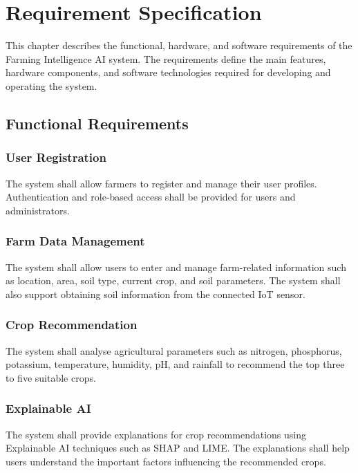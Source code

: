 \chapter{Requirement Specification}

This chapter describes the functional, hardware, and software requirements of the Farming Intelligence AI system. The requirements define the main features, hardware components, and software technologies required for developing and operating the system.

\section{Functional Requirements}

\subsection{User Registration}

The system shall allow farmers to register and manage their user profiles. Authentication and role-based access shall be provided for users and administrators.

\subsection{Farm Data Management}

The system shall allow users to enter and manage farm-related information such as location, area, soil type, current crop, and soil parameters. The system shall also support obtaining soil information from the connected IoT sensor.

\subsection{Crop Recommendation}

The system shall analyse agricultural parameters such as nitrogen, phosphorus, potassium, temperature, humidity, pH, and rainfall to recommend the top three to five suitable crops.

\subsection{Explainable AI}

The system shall provide explanations for crop recommendations using Explainable AI techniques such as SHAP and LIME. The explanations shall help users understand the important factors influencing the recommended crops.

